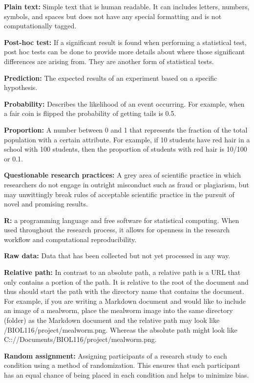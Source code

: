 \documentclass[
]{book}
\begin{document}
\textbf{Plain text:} Simple text that is human readable. It can includes letters, numbers, symbols, and spaces but does not have any special formatting and is not computationally tagged.

\textbf{Post-hoc test:} If a significant result is found when performing a statistical test, post hoc tests can be done to provide more details about where those significant differences are arising from. They are another form of statistical tests.

\textbf{Prediction:} The expected results of an experiment based on a specific hypothesis.

\textbf{Probability:} Describes the likelihood of an event occurring. For example, when a fair coin is flipped the probability of getting tails is 0.5.

\textbf{Proportion:} A number between 0 and 1 that represents the fraction of the total population with a certain attribute. For example, if 10 students have red hair in a school with 100 students, then the proportion of students with red hair is 10/100 or 0.1.

\textbf{Questionable research practices:} A grey area of scientific practice in which researchers do not engage in outright misconduct such as fraud or plagiarism, but may unwittingly break rules of acceptable scientific practice in the pursuit of novel and promising results.

\textbf{R:} a programming language and free software for statistical computing. When used throughout the research process, it allows for openness in the research workflow and computational reproducibility.

\textbf{Raw data:} Data that has been collected but not yet processed in any way.

\textbf{Relative path:} In contrast to an absolute path, a relative path is a URL that only contains a portion of the path. It is relative to the root of the document and thus should start the path with the directory name that contains the document. For example, if you are writing a Markdown document and would like to include an image of a mealworm, place the mealworm image into the same directory (folder) as the Markdown document and the relative path may look like /BIOL116/project/mealworm.png. Whereas the absolute path might look like C:://Documents/BIOL116/project/mealworm.png.

\textbf{Random assignment:} Assigning participants of a research study to each condition using a method of randomization. This ensures that each participant has an equal chance of being placed in each condition and helps to minimize bias.
\end{document}
